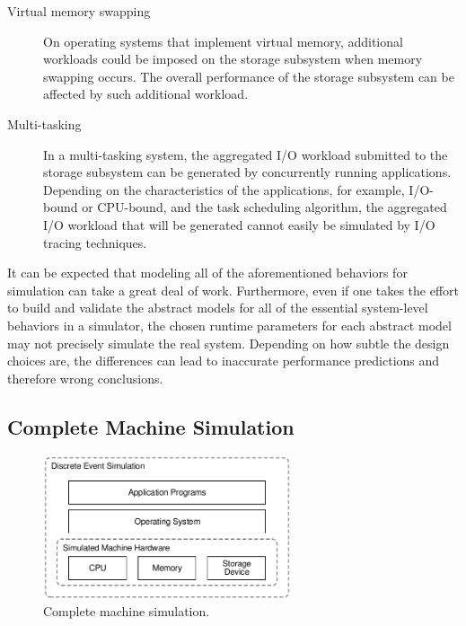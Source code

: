 \begin{description}
	\item[Virtual memory swapping] On operating systems that implement virtual memory, additional workloads could be imposed on the storage subsystem when memory swapping occurs. The overall performance of the storage subsystem can be affected by such additional workload.
	
	\item[Multi-tasking] In a multi-tasking system, the aggregated I/O workload submitted to the storage subsystem can be generated by concurrently running applications. Depending on the characteristics of the applications, for example, I/O-bound or CPU-bound, and the task scheduling algorithm, the aggregated I/O workload that will be generated cannot easily be simulated by I/O tracing techniques. 
\end{description}

It can be expected that modeling all of the aforementioned behaviors for simulation can take a great deal of work. Furthermore, even if one takes the effort to build and validate the abstract models for all of the essential system-level behaviors in a simulator, the chosen runtime parameters for each abstract model may not precisely simulate the real system. Depending on how subtle the design choices are, the differences can lead to inaccurate performance predictions and therefore wrong conclusions.

\subsection{Complete Machine Simulation}

\begin{figure}[htpb!]
	\centering
	\includegraphics[width=0.65\textwidth]{figures/complete-machine-simulation.pdf}
	\caption{\label{fig:complete-machine-simulation}Complete machine simulation.}
\end{figure}

